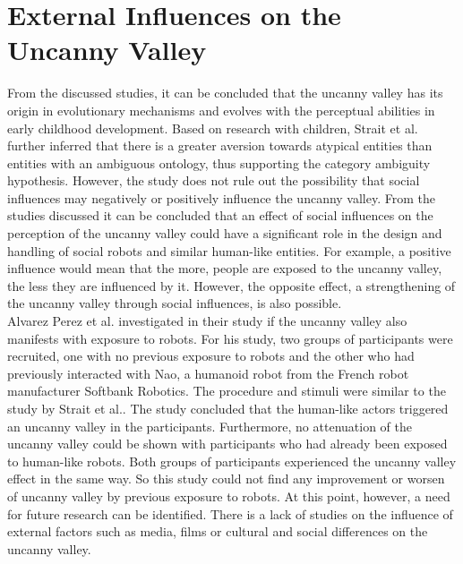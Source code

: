\section{External Influences on the Uncanny Valley}
From the discussed studies, it can be concluded that the uncanny valley has its origin in evolutionary mechanisms and evolves with the perceptual abilities in early childhood development. Based on research with children, Strait et al. \cite{childrens_responding} further inferred that there is a greater aversion towards atypical entities than entities with an ambiguous ontology, thus supporting the category ambiguity hypothesis. However, the study does not rule out the possibility that social influences may negatively or positively influence the uncanny valley. From the studies discussed it can be concluded that an effect of social influences on the perception of the uncanny valley could have a significant role in the design and handling of social robots and similar human-like entities. For example, a positive influence would mean that the more, people are exposed to the uncanny valley, the less they are influenced by it. However, the opposite effect, a strengthening of the uncanny valley through social influences, is also possible.\\
Alvarez Perez et al. \cite{prior_exposure_robots} investigated in their study if the uncanny valley also manifests with exposure to robots. For his study, two groups of participants were recruited, one with no previous exposure to robots and the other who had previously interacted with Nao, a humanoid robot from the French robot manufacturer Softbank Robotics. The procedure and stimuli were similar to the study by Strait et al.. The study concluded that the human-like actors triggered an uncanny valley in the participants. Furthermore, no attenuation of the uncanny valley could be shown with participants who had already been exposed to human-like robots. Both groups of participants experienced the uncanny valley effect in the same way. So this study could not find any improvement or worsen of uncanny valley by previous exposure to robots. At this point, however, a need for future research can be identified. There is a lack of studies on the influence of external factors such as media, films or cultural and social differences on the uncanny valley.